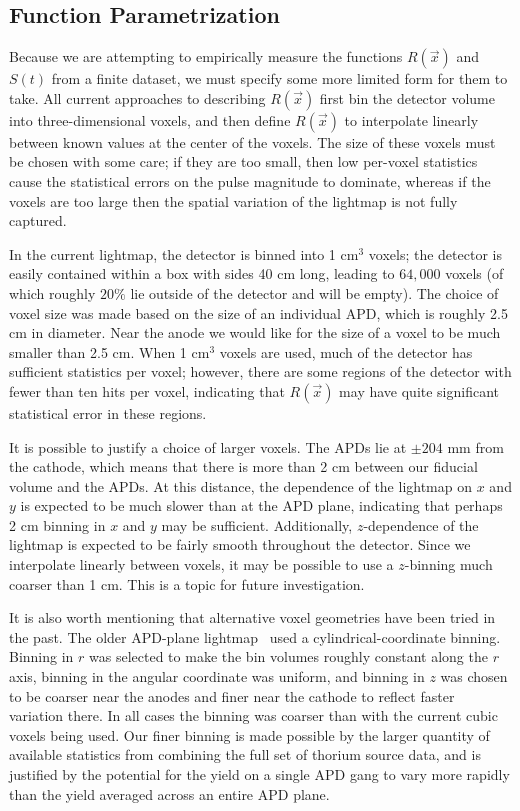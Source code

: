 \subsection{Function Parametrization} \label{sec:LightmapFunctionParametrization}

Because we are attempting to empirically measure the functions $R(\vec{x})$ and $S(t)$ from a finite dataset, we must specify some more limited form for them to take.  All current approaches to describing $R(\vec{x})$ first bin the detector volume into three-dimensional voxels, and then define $R(\vec{x})$ to interpolate linearly between known values at the center of the voxels.  The size of these voxels must be chosen with some care; if they are too small, then low per-voxel statistics cause the statistical errors on the pulse magnitude to dominate, whereas if the voxels are too large then the spatial variation of the lightmap is not fully captured.

In the current lightmap, the detector is binned into 1 cm$^3$ voxels; the detector is easily contained within a box with sides 40 cm long, leading to $64,000$ voxels (of which roughly $20\%$ lie outside of the detector and will be empty).  The choice of voxel size was made based on the size of an individual APD, which is roughly 2.5 cm in diameter. Near the anode we would like for the size of a voxel to be much smaller than 2.5 cm.  When 1 cm$^3$ voxels are used, much of the detector has sufficient statistics per voxel; however, there are some regions of the detector with fewer than ten hits per voxel, indicating that $R(\vec{x})$ may have quite significant statistical error in these regions.

It is possible to justify a choice of larger voxels.  The APDs lie at $\pm 204$ mm from the cathode, which means that there is more than 2 cm between our fiducial volume and the APDs.  At this distance, the dependence of the lightmap on $x$ and $y$ is expected to be much slower than at the APD plane, indicating that perhaps 2 cm binning in $x$ and $y$ may be sufficient.  Additionally, $z$-dependence of the lightmap is expected to be fairly smooth throughout the detector. Since we interpolate linearly between voxels, it may be possible to use a $z$-binning much coarser than 1 cm.  This is a topic for future investigation.

It is also worth mentioning that alternative voxel geometries have been tried in the past.  The older APD-plane lightmap~\cite{ThesisSteve} used a cylindrical-coordinate binning. Binning in $r$ was selected to make the bin volumes roughly constant along the $r$ axis, binning in the angular coordinate was uniform, and binning in $z$ was chosen to be coarser near the anodes and finer near the cathode to reflect faster variation there.  In all cases the binning was coarser than with the current cubic voxels being used. Our finer binning is made possible by the larger quantity of available statistics from combining the full set of thorium source data, and is justified by the potential for the yield on a single APD gang to vary more rapidly than the yield averaged across an entire APD plane.

